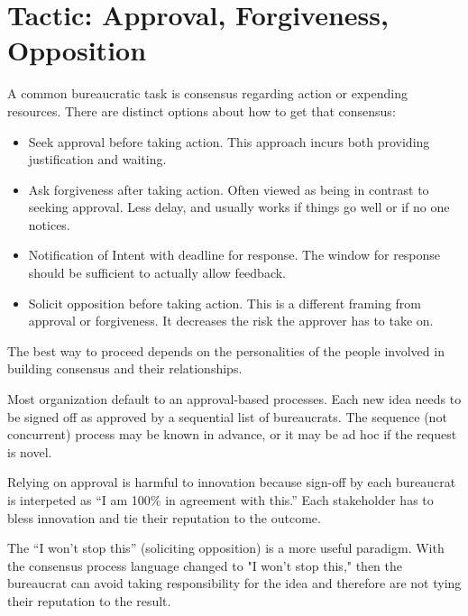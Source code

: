 \section{Tactic: Approval, Forgiveness, Opposition}

A common bureaucratic task is consensus regarding action or expending resources. There are distinct options about how to get that consensus:
\begin{itemize}
    \item Seek approval before taking action. This approach incurs both providing justification and waiting.
    \item Ask forgiveness after taking action. Often viewed as being in contrast to seeking approval. Less delay, and usually works if things go well or if no one notices. 
    \item Notification of Intent with deadline for response. The window for response should be sufficient to actually allow feedback. 
    \item Solicit opposition before taking action. This is a different framing from approval or forgiveness. It decreases the risk the approver has to take on.
\end{itemize}
The best way to proceed depends on the personalities of the people involved in building consensus and their relationships. 

Most organization default to an approval-based  processes. Each new idea needs to be signed off as approved by a sequential list of bureaucrats. The sequence (not concurrent) process may be known in advance, or it may be ad hoc if the request is novel.

Relying on approval is harmful to innovation because sign-off by each bureaucrat is interpeted as ``I am 100\% in agreement with this.'' Each stakeholder has to bless innovation and tie their reputation to the outcome.

The ``I won't stop this'' (soliciting opposition) is a more useful paradigm. With the consensus process language changed to "I won't stop this," then the bureaucrat can avoid taking responsibility for the idea and therefore are not tying their reputation to the result.

